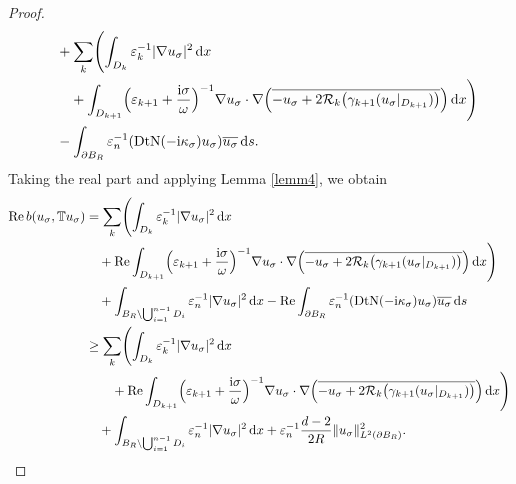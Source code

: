 \documentclass[12pt,reqno]{amsart}
\numberwithin{equation}{section}
\begin{document}
\begin{proof}
\begin{align*}
    &\quad + \sum_{k} \Biggl( \int_{D_k} \varepsilon_k^{-1} |\nabla u_\sigma|^2 \, {\rm d}x \\
    &\qquad + \int_{D_{k+1}} \Bigl(\varepsilon_{k+1} + \frac{{\rm i}\sigma}{\omega}\Bigr)^{-1}
    \nabla u_\sigma \cdot \nabla \Bigl( \overline{-u_\sigma + 2\mathcal{R}_k\bigl(\gamma_{k+1}(u_\sigma|_{D_{k+1}})\bigr)} \Bigr) \, {\rm d}x \Biggr) \\
    &\quad - \int_{\partial B_{R}} \varepsilon_n^{-1} (\operatorname{DtN}(-{\rm i}\kappa_\sigma) u_\sigma) \overline{u_\sigma} \, {\rm d}s.
\end{align*}
Taking the real part and applying Lemma \ref{lemm4}, we obtain
\begin{align}\label{eq12}
\operatorname{Re}b(u_\sigma,\mathbb{T}u_\sigma)
&=\sum_{k}\Biggl(\int_{D_k}\varepsilon_k^{-1}|\nabla u_\sigma|^2\,{\rm d}x\nonumber\\
&\quad+ \operatorname{Re}\int_{D_{k+1}} \Bigl(\varepsilon_{k+1} + \frac{{\rm i}\sigma}{\omega}\Bigr)^{-1}
    \nabla u_\sigma \cdot \nabla \Bigl( \overline{-u_\sigma + 2\mathcal{R}_k\bigl(\gamma_{k+1}(u_\sigma|_{D_{k+1}})\bigr)} \Bigr) \, {\rm d}x \Biggr) \nonumber\\
&\quad+\int_{B_{R}\setminus\bigcup_{i=1}^{n-1}D_i}\varepsilon_n^{-1}|\nabla u_\sigma|^2\,{\rm d}x
-\operatorname{Re}\int_{\partial B_{R}}\varepsilon_n^{-1}(\operatorname{DtN}(-{\rm i}\kappa_\sigma)u_\sigma)\overline{u_\sigma}\,{\rm d}s \nonumber\\
&\ge\sum_{k}\Biggl(\int_{D_k}\varepsilon_k^{-1}|\nabla u_\sigma|^2\,{\rm d}x \nonumber\\
&\qquad+ \operatorname{Re}\int_{D_{k+1}} \Bigl(\varepsilon_{k+1} + \frac{{\rm i}\sigma}{\omega}\Bigr)^{-1}
    \nabla u_\sigma \cdot \nabla \Bigl( \overline{-u_\sigma + 2\mathcal{R}_k\bigl(\gamma_{k+1}(u_\sigma|_{D_{k+1}})\bigr)} \Bigr) \, {\rm d}x \Biggr) \nonumber\\
&\quad+\int_{B_{R}\setminus\bigcup_{i=1}^{n-1}D_i}\varepsilon_n^{-1}|\nabla u_\sigma|^2\,{\rm d}x
+\varepsilon_n^{-1}\frac{d-2}{2R}\|u_\sigma\|_{L^2(\partial B_R)}^2.
\end{align}





\end{proof}
\end{document}
